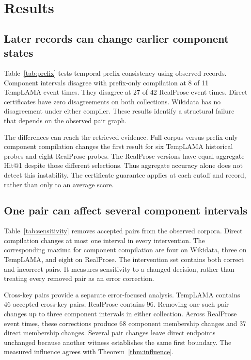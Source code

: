 \section{Results}
\label{sec:results}

\subsection{Later records can change earlier component states}

Table~\ref{tab:prefix} tests temporal prefix consistency using observed records.
Component intervals disagree with prefix-only compilation at 8 of 11 TempLAMA event times.
They disagree at 27 of 42 RealProse event times.
Direct certificates have zero disagreements on both collections.
Wikidata has no disagreement under either compiler.
These results identify a structural failure that depends on the observed pair graph.


The differences can reach the retrieved evidence.
Full-corpus versus prefix-only component compilation changes the first result for six TempLAMA historical probes and eight RealProse probes.
The RealProse versions have equal aggregate Hit@1 despite those different selections.
Thus aggregate accuracy alone does not detect this instability.
The certificate guarantee applies at each cutoff and record, rather than only to an average score.

\subsection{One pair can affect several component intervals}

Table~\ref{tab:sensitivity} removes accepted pairs from the observed corpora.
Direct compilation changes at most one interval in every intervention.
The corresponding maxima for component compilation are four on Wikidata, three on TempLAMA, and eight on RealProse.
The intervention set contains both correct and incorrect pairs.
It measures sensitivity to a changed decision, rather than treating every removed pair as an error correction.


Cross-key pairs provide a separate error-focused analysis.
TempLAMA contains 46 accepted cross-key pairs; RealProse contains 96.
Removing one such pair changes up to three component intervals in either collection.
Across RealProse event times, these corrections produce 68 component membership changes and 37 direct membership changes.
Several pair changes leave direct endpoints unchanged because another witness establishes the same first boundary.
The measured influence agrees with Theorem~\ref{thm:influence}.

